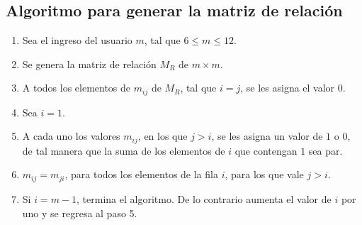 \documentclass[12pt]{article}
\begin{document}
\subsection{Algoritmo para generar la matriz de relaci\'{o}n}
\begin{enumerate}
\item Sea el ingreso del usuario $m$, tal que $6\leq m\leq 12$.
\item Se genera la matriz de relaci\'{o}n $M_{R}$ de $m \times m$.
\item A todos los elementos de $m_{ij}$ de $M_{R}$, tal que $i=j$, se les asigna el valor $0$.
\item Sea $i=1$.
\item A cada uno los valores $m_{ij}$, en los que $j>i$, se les asigna un valor de $1$ o $0$, de tal manera que la suma de los elementos de $i$ que contengan $1$ sea par.
\item $m_{ij}=m_{ji}$, para todos los elementos de la fila $i$, para los que vale $j>i$.
\item Si $i=m-1$, termina el algoritmo. De lo contrario aumenta el valor de $i$ por uno y se regresa al paso 5.
\end{enumerate}
\end{document}
